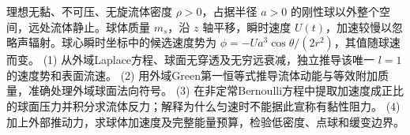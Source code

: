 理想无黏、不可压、无旋流体密度 \(\rho>0\)，占据半径 \(a>0\) 的刚性球以外整个空间，远处流体静止。球体质量 \(m_s\)，沿 \(z\) 轴平移，瞬时速度 \(U(t)\)，加速较慢以忽略声辐射。球心瞬时坐标中的候选速度势为 \(\phi=-Ua^3\cos\theta/(2r^2)\)，其值随球速而变。
(1) 从外域Laplace方程、球面无穿透及无穷远衰减，独立推导该唯一 \(l=1\) 的速度势和表面流速。
(2) 用外域Green第一恒等式推导流体动能与等效附加质量，准确处理外域球面法向符号。
(3) 在非定常Bernoulli方程中提取加速度成正比的球面压力并积分求流体反力；解释为什么匀速时不能据此宣称有黏性阻力。
(4) 加上外部推动力，求球体加速度及完整能量预算，检验低密度、点球和缓变边界。
